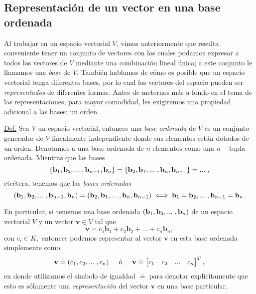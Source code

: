 \documentclass[12pt]{article}
\begin{document}
\subsection{Representación de un vector en una base ordenada}

Al trabajar en un espacio vectorial $V$, vimos anteriormente que resulta conveniente tener un conjunto de vectores con los cuales podamos expresar a todos los vectores de $V$ mediante una combinación lineal única; a este conjunto le llamamos una \emph{base} de $V$. También hablamos de cómo es posible que un espacio vectorial tenga diferentes bases, por lo cual los vectores del espacio pueden ser \emph{representados} de diferentes formas. Antes de meternos más a fondo en el tema de las representaciones, para mayor comodidad, les exigiremos una propiedad adicional a las bases: un orden.

\begin{tcolorbox}
    \underline{Def.} Sea $V$ un espacio vectorial, entonces una \emph{base ordenada} de $V$ es un conjunto generador de $V$ linealmente independiente donde sus elementos están dotados de un orden. Denotamos a una base ordenada de $n$ elementos como una $n-$tupla ordenada. Mientras que las bases \[
        \{\mathbf{b}_1, \mathbf{b}_2, ...\hspace{1mm},\mathbf{b}_{n-1}, \mathbf{b}_n\} = \{\mathbf{b}_2,\mathbf{b}_{1},...\hspace{1mm},\mathbf{b}_n,\mathbf{b}_{n-1}\} = ...\hspace{1mm}   
    ,\] \noindent etcétera, tenemos que las \emph{bases ordenadas} \[
    (\mathbf{b}_1,\mathbf{b}_2,...\hspace{1mm},\mathbf{b}_{n-1},\mathbf{b}_n)=(\mathbf{b}_2,\mathbf{b}_1,...\hspace{1mm},\mathbf{b}_n,\mathbf{b}_{n-1})\iff\mathbf{b}_1 = \mathbf{b}_2, ...\hspace{1mm}, \mathbf{b}_{n-1} = \mathbf{b}_n 
    .\]  

\vspace{3mm}

\end{tcolorbox}

En particular, si tenemos una base ordenada $(\mathbf{b}_1,\mathbf{b}_2,...\hspace{1mm}, \mathbf{b}_n)$ de un espacio vectorial $V$ y un vector $\mathbf{v}\in V$ tal que \[
\mathbf{v} = c_1\mathbf{b}_1+c_2\mathbf{b}_2+...+c_n\mathbf{b}_n,
\] \noindent con $c_i \in K,$ entonces podemos representar al vector $\mathbf{v}$ en esta base ordenada simplemente como $$\mathbf{v}\doteq (c_1,c_2,...\hspace{1mm} ,c_n)\hspace{5mm} \text{ó} \hspace{5mm} \mathbf{v}\doteq \begin{bmatrix} c_1&c_2&...&c_n \end{bmatrix}^T,$$ \noindent en donde utilizamos el símbolo de igualdad $\doteq$ para denotar explícitamente que esto es sólamente una \emph{representación} del vector $\mathbf{v}$ en una base particular. 
\end{document}
